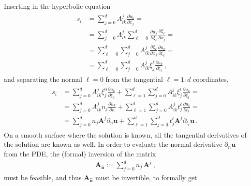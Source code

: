 \documentclass[letterpaper,10pt,english]{jupyterBook}
\begin{document}
\sphinxAtStartPar
Inserting in the hyperbolic equation
\begin{equation*}
\begin{split}\begin{aligned}
  s_i
  & = \sum_{j=0}^{d} A^{j}_{ik} \frac{\partial u_k}{\partial x_j} = \\
  & = \sum_{j=0}^{d} A^{j}_{ik} \sum_{\ell=0}^{d} \frac{\partial u_k}{\partial \xi_\ell} \frac{\partial \xi_\ell}{\partial x_j} = \\ 
  & = \sum_{\ell=0}^{d}  \sum_{j=0}^{d}  A^{j}_{ik} \frac{\partial \xi_\ell}{\partial x_j} \frac{\partial u_k}{\partial \xi_\ell} = \\ 
  & = \sum_{\ell=0}^{d}  \sum_{j=0}^{d}  A^{j}_{ik} \xi^\ell_j \frac{\partial u_k}{\partial \xi_\ell} \ ,
\end{aligned}\end{split}
\end{equation*}
\sphinxAtStartPar
and separating the normal \(\ell = 0\) from the tangential \(\ell=1:d\) coordinates,
\begin{equation*}
\begin{split}\begin{aligned}
  s_i
  & = \sum_{j=0}^{d} A^j_{ik} \xi^0_j \frac{\partial u_k}{\partial \xi_0} + \sum_{\ell=1}^{d} \sum_{j=0}^{d} A^j_{ik} \xi^t_j \frac{\partial u_k}{\partial \xi_t} = \\
  & = \sum_{j=0}^{d} A^j_{ik} n_j \frac{\partial u_k}{\partial n} + \sum_{\ell=1}^{d} \sum_{j=0}^{d} A^j_{ik} t^\ell_j \frac{\partial u_k}{\partial t_\ell} = \\
  & = \sum_{j=0}^{d} n_j \mathbf{A}^j \partial_n \mathbf{u} + \sum_{\ell=1}^{d} \sum_{j=0}^{d} t^\ell_j \mathbf{A}^j \partial_{t_\ell} \mathbf{u} \ .
\end{aligned}\end{split}
\end{equation*}
\sphinxAtStartPar
On a smooth surface where the solution is known, all the tangential derivatives of the solution are known as well. In order to evaluate the normal derivative \(\partial_n \mathbf{u}\) from the PDE, the (formal) inversion of the matrix
\begin{equation*}
\begin{split}\mathbf{A}_{\hat{\mathbf{n}}} := \sum_{j=0}^{d} n_j \, \mathbf{A}^j \ ,\end{split}
\end{equation*}
\sphinxAtStartPar
must be feasible, and thus \(\mathbf{A}_{\hat{\mathbf{n}}}\) must be invertible, to formally get
\end{document}
